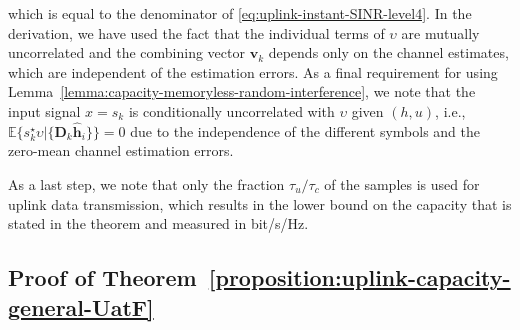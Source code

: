 \documentclass[SIG,biber]{nowfnt}
\newcommand{\vect}[1]{\mathbf{#1}}
\begin{document}
		\endgroup
which is equal to  the denominator of \eqref{eq:uplink-instant-SINR-level4}. In the derivation, we have used the fact that the individual terms of $\upsilon$ are mutually uncorrelated and the combining vector $\vect{v}_k$ depends only on the channel estimates, which are independent of the estimation errors. As a final requirement for using Lemma~\ref{lemma:capacity-memoryless-random-interference}, we note that the input signal $x=s_k$ is conditionally uncorrelated with $\upsilon$ given $(h,u)$, i.e., $\mathbb{E}\{s_k^{\star}\upsilon|\{\vect{D}_k\widehat{\vect{h}}_i\}\}=0$ due to the independence of the different symbols and the zero-mean channel estimation errors. 

 As a last step, we note that only the fraction $\tau_u/\tau_c$ of the samples is used for uplink data transmission, which results in the lower bound on the capacity that is stated in the theorem and measured in bit/s/Hz.
 
 \subsection{Proof of Theorem~\ref{proposition:uplink-capacity-general-UatF}}\label{proof-of-proposition:uplink-capacity-general-UatF}
\end{document}
